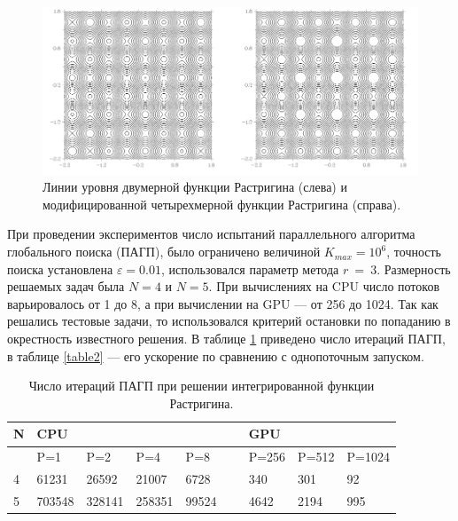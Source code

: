 \documentclass[10pt,a4paper]{book}
\begin{document}
\begin{figure}
\begin{center}
  \includegraphics[width=1.0\linewidth]{./pic/s2.png}
  \caption{Линии уровня двумерной функции Растригина (слева) и модифицированной четырехмерной функции Растригина (справа).}
  \label{fig:s2}  
\end{center}
\end{figure}


При проведении экспериментов число испытаний параллельного алгоритма глобального поиска (ПАГП), было ограничено величиной $K_{max}=10^6$, точность поиска установлена $\varepsilon=0.01$, использовался параметр метода $r\ =\ 3$. Размерность решаемых задач была $N = 4$ и $N = 5$. При вычислениях на CPU число потоков варьировалось от 1 до 8, а при вычислении на GPU --- от 256 до 1024. Так как решались тестовые задачи, то использовался критерий остановки по попаданию в окрестность известного решения. В таблице \ref{table1} приведено число итераций ПАГП, в таблице \ref{table2} --- его ускорение по сравнению с однопоточным запуском.

\begin{table}[!ht]
    \centering
            \caption{Число итераций ПАГП при решении интегрированной функции Растригина.}
    \label{table1}
    \begin{tabular}{|l|l|l|l|l|l|l|l|l|}
    \hline
        N & CPU &   & ~ & ~ & ~ & GPU  & ~ & ~ \\ \hline
        ~ & P=1 & P=2 & P=4 & P=8 &   & P=256 & P=512 & P=1024  \\ \hline
        4 & 61231 & 26592 & 21007 & 6728 &   & 340 & 301 & 92  \\ \hline
        5 & 703548 & 328141 & 258351 & 99524 &   & 4642 & 2194 & 995  \\ \hline
    \end{tabular}
\end{table}
\end{document}
